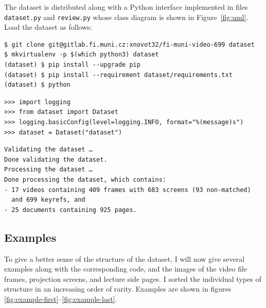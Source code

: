 The dataset is distributed along with a Python interface implemented in files
\texttt{dataset.py} and \texttt{review.py} whose class diagram is shown in
Figure~\ref{fig:uml}. Load the dataset as follows:
\begin{listings}
\begin{verbatim}
$ git clone git@gitlab.fi.muni.cz:xnovot32/fi-muni-video-699 dataset
$ mkvirtualenv -p $(which python3) dataset
(dataset) $ pip install --upgrade pip
(dataset) $ pip install --requirement dataset/requirements.txt
(dataset) $ python
\end{verbatim}
\begin{verbatim}
>>> import logging
>>> from dataset import Dataset
>>> logging.basicConfig(level=logging.INFO, format="%(message)s")
>>> dataset = Dataset("dataset")
\end{verbatim}
\begin{verbatim}
Validating the dataset …
Done validating the dataset.
Processing the dataset …
Done processing the dataset, which contains:
- 17 videos containing 409 frames with 683 screens (93 non-matched)
  and 699 keyrefs, and
- 25 documents containing 925 pages.
\end{verbatim}
\end{listings}

\subsection{Examples}
\label{sec:examples}
To give a better sense of the structure of the dataset, I will now give several
examples along with the corresponding  code, and the images of the
video file frames, projection screens, and lecture side pages. I sorted the
individual types of structure in an increasing order of rarity. Examples
are shown in figures \ref{fig:example-first}--\ref{fig:example-last}.

